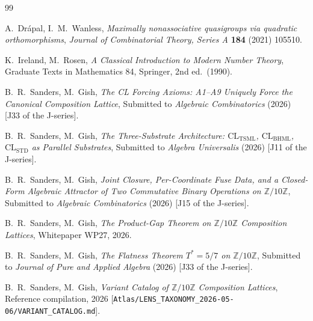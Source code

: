 \documentclass[11pt,reqno]{amsart}
\theoremstyle{plain}
\theoremstyle{definition}
\theoremstyle{remark}
\newcommand{\Z}{\mathbb{Z}}
\newcommand{\TSML}{\mathrm{TSML}}
\newcommand{\BHML}{\mathrm{BHML}}
\begin{document}
\begin{thebibliography}{99}

A.~Drápal, I.~M.~Wanless,
\emph{Maximally nonassociative quasigroups via quadratic orthomorphisms},
\emph{Journal of Combinatorial Theory, Series A} \textbf{184} (2021)
105510.

K.~Ireland, M.~Rosen,
\emph{A Classical Introduction to Modern Number Theory},
Graduate Texts in Mathematics 84, Springer, 2nd ed.\ (1990).

B.~R.~Sanders, M.~Gish,
\emph{The CL Forcing Axioms: A1--A9 Uniquely Force the Canonical Composition Lattice},
Submitted to \emph{Algebraic Combinatorics} (2026)
[J33 of the J-series].

B.~R.~Sanders, M.~Gish,
\emph{The Three-Substrate Architecture: $\mathrm{CL}_\TSML$, $\mathrm{CL}_\BHML$, $\mathrm{CL}_\mathrm{STD}$ as Parallel Substrates},
Submitted to \emph{Algebra Universalis} (2026)
[J11 of the J-series].

B.~R.~Sanders, M.~Gish,
\emph{Joint Closure, Per-Coordinate Fuse Data, and a Closed-Form Algebraic Attractor of Two Commutative Binary Operations on $\Z/10\Z$},
Submitted to \emph{Algebraic Combinatorics} (2026)
[J15 of the J-series].

B.~R.~Sanders, M.~Gish,
\emph{The Product-Gap Theorem on $\Z/10\Z$ Composition Lattices},
Whitepaper WP27, 2026.

B.~R.~Sanders, M.~Gish,
\emph{The Flatness Theorem $T^* = 5/7$ on $\Z/10\Z$},
Submitted to \emph{Journal of Pure and Applied Algebra} (2026)
[J33 of the J-series].

B.~R.~Sanders, M.~Gish,
\emph{Variant Catalog of $\Z/10\Z$ Composition Lattices},
Reference compilation, 2026
[\texttt{Atlas/LENS\_TAXONOMY\_2026-05-06/VARIANT\_CATALOG.md}].

\end{thebibliography}
\end{document}
